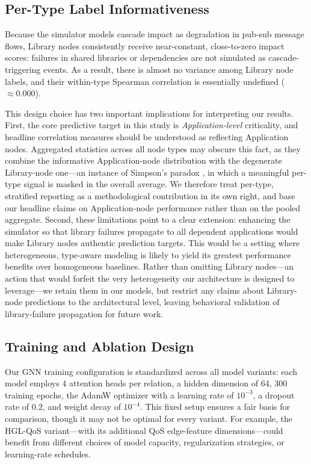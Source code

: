 \documentclass[review]{elsarticle}
\begin{document}
\subsection{Per-Type Label Informativeness}

Because the simulator models cascade impact as degradation in pub-sub message flows, Library nodes
consistently receive near-constant, close-to-zero impact scores: failures in shared libraries or
dependencies are not simulated as cascade-triggering events. As a result, there is almost no
variance among Library node labels, and their within-type Spearman correlation is essentially
undefined ($\approx 0.000$).

This design choice has two important implications for interpreting our results. First, the core
predictive target in this study is \emph{Application-level} criticality, and headline correlation
measures should be understood as reflecting Application nodes. Aggregated statistics across all
node types may obscure this fact, as they combine the informative Application-node distribution
with the degenerate Library-node one---an instance of Simpson's paradox
\cite{Simpson1951,Bickel1975}, in which a meaningful per-type signal is masked in the overall
average. We therefore treat per-type, stratified reporting as a methodological contribution in its
own right, and base our headline claims on Application-node performance rather than on the pooled
aggregate. Second, these limitations point to a clear extension: enhancing the simulator so that
library failures propagate to all dependent applications would make Library nodes authentic
prediction targets. This would be a setting where heterogeneous, type-aware modeling is likely to
yield its greatest performance benefits over homogeneous baselines. Rather than omitting Library
nodes---an action that would forfeit the very heterogeneity our architecture is designed to
leverage---we retain them in our models, but restrict any claims about Library-node predictions to
the architectural level, leaving behavioral validation of library-failure propagation for future
work.

\subsection{Training and Ablation Design}

Our GNN training configuration is standardized across all model variants: each model employs 4
attention heads per relation, a hidden dimension of 64, 300 training epochs, the AdamW optimizer
with a learning rate of $10^{-3}$, a dropout rate of 0.2, and weight decay of $10^{-4}$. This fixed
setup ensures a fair basis for comparison, though it may not be optimal for every variant. For
example, the HGL-QoS variant---with its additional QoS edge-feature dimensions---could benefit from
different choices of model capacity, regularization strategies, or learning-rate schedules.
\end{document}
